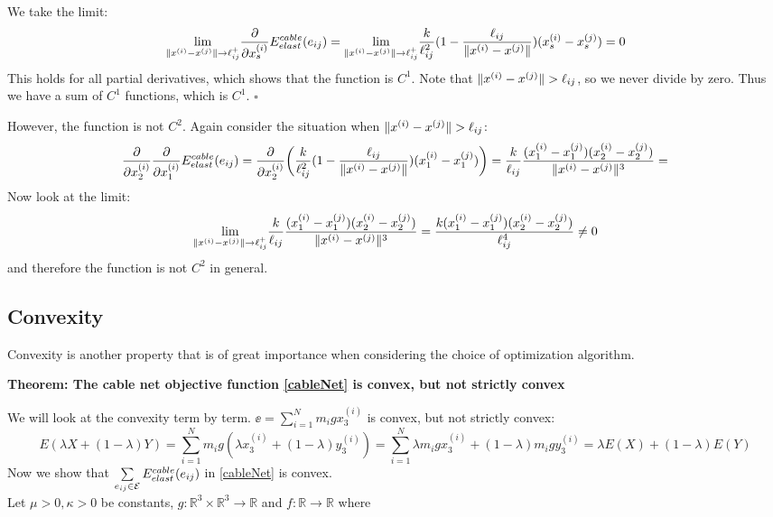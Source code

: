 We take the limit:
\begin{equation}
    \underset{\lVert x^{(i)} - x^{(j)}\rVert \to \ell_{ij} ^+}{\text{lim}} \frac{\partial}{\partial x_s^{(i)}} E^{cable}_{elast}(e_{ij}) =    \underset{\lVert x^{(i)} - x^{(j)}\rVert \to \ell_{ij} ^+}{\text{lim}} \frac{k}{\ell_{ij}^2} (1- \frac{\ell_{ij}}{\lVert x^{(i)} - x^{(j)}\rVert}) (x_s^{(i)} - x_s^{(j)}) = 0
\end{equation}
This holds for all partial derivatives, which shows that the function is $C^1$. Note that $\lVert x^{(i)} - x^{(j)}\rVert>\ell_{ij}$, so we never divide by zero. Thus we have a sum of $C^1$ functions, which is $C^1$. \hfill $\square$ 

However, the function is not $C^2$. Again consider the situation when $\lVert x^{(i)} - x^{(j)}\rVert > \ell_{ij}$:
\begin{equation*}
    \frac{\partial}{\partial x_2^{(i)}} \frac{\partial}{\partial x_1^{(i)}} E^{cable}_{elast}(e_{ij}) = \frac{\partial}{\partial x_2^{(i)}}  \bigg (\frac{k}{\ell_{ij}^2} (1- \frac{\ell_{ij}}{\lVert x^{(i)} - x^{(j)}\rVert}) (x_1^{(i)} - x_1^{(j)}) \bigg) = \frac{k}{\ell_{ij}} \frac{(x_1^{(i)} - x_1^{(j)}) (x_2^{(i)}-x_2^{(j)})}{\lVert x^{(i)} - x^{(j)}\rVert^3} = 
\end{equation*}
Now look at the limit: $$ \underset{\lVert x^{(i)} - x^{(j)}\rVert \to \ell_{ij} ^+}{\text{lim}} \frac{k}{\ell_{ij}}\frac{ (x_1^{(i)} - x_1^{(j)}) (x_2^{(i)}-x_2^{(j)})}{\lVert x^{(i)} - x^{(j)}\rVert^3} = \frac{k (x_1^{(i)} - x_1^{(j)}) (x_2^{(i)}-x_2^{(j)})}{\ell_{ij}^4} \neq 0 $$ and therefore the function is not $C^2$ in general.


\subsection{Convexity}
Convexity is another property that is of great importance when considering the choice of optimization algorithm. 

\textbf{Theorem: The cable net objective function \eqref{cableNet} is convex, but not strictly convex}

We will look at the convexity term by term.
$\ee =\sum_{i=1}^N m_i g x_3^{(i)}$ is convex, but not strictly convex:
\begin{equation*}
    E(\lambda X +(1-\lambda) Y) = \sum_{i=1}^N m_i g (\lambda x_3^{(i)} + (1-\lambda) y_3^{(i)})
    =\sum_{i=1}^N \lambda m_i g x_3^{(i)} + (1-\lambda) m_i g  y_3^{(i)} = \lambda E(X) + (1-\lambda) E(Y)
\end{equation*} 
Now we show that $\sum\limits_{e_{ij} \in \mathcal{E}} E^{cable}_{elast}(e_{ij})$ in \eqref{cableNet} is convex. \\
Let $\mu > 0, \kappa > 0$  be constants, $g: \mathbb{R}^3 \times \mathbb{R}^3 \rightarrow \mathbb{R}$ and $f: \mathbb{R} \rightarrow \mathbb{R}$ where 


